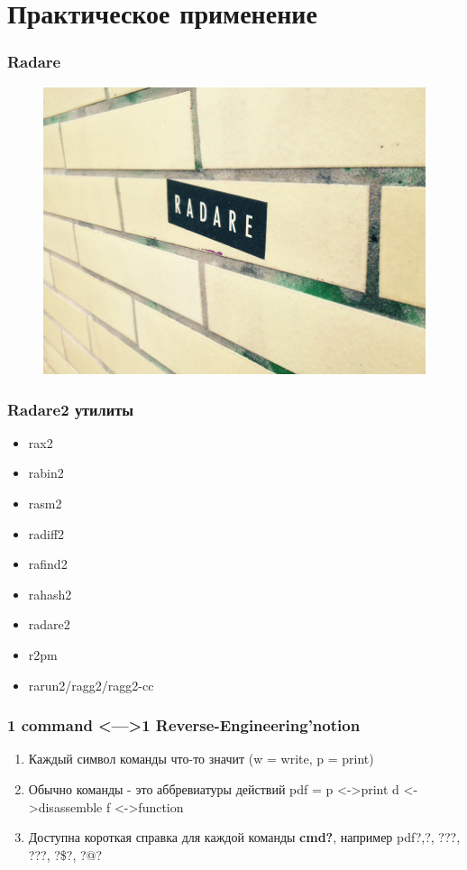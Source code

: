 \documentclass[10pt,pdf,utf8,english,compress,hyperref={unicode}]{beamer}
\begin{document}
\section{Практическое применение}

\begin{frame}[fragile]
	\frametitle{Radare}
	\begin{figure}
		\includegraphics[scale=0.2]{r2-ubahn.jpg}
	\end{figure}
\end{frame}

\begin{frame}[fragile]
  \frametitle{Radare2 утилиты}
     \begin{itemize}
        \item rax2
        \item rabin2
        \item rasm2
        \item radiff2
        \item rafind2
        \item rahash2
        \item radare2
        \item r2pm
        \item rarun2/ragg2/ragg2-cc
      \end{itemize}
\end{frame}

\begin{frame}[fragile]
  \frametitle{1 command \textless—\textgreater 1 Reverse-Engineering'notion}
  \begin{enumerate}
  \item Каждый символ команды что-то значит \alert{(w = write, p = print)}
  \item Обычно команды - это аббревиатуры действий \alert{pdf = p \textless-\textgreater print d \textless-\textgreater disassemble f \textless-\textgreater function }
  \item Доступна короткая справка для каждой команды \textbf{cmd?}, например \alert{pdf?},\alert{?}, \alert{???}, \alert{???}, \alert{?\$?}, \alert{?@?}
  \end{enumerate}
\end{frame}
\end{document}
